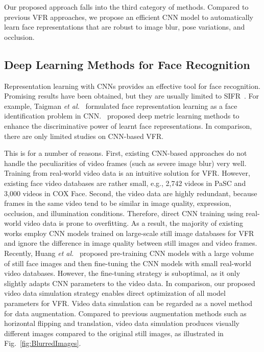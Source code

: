 \documentclass[10pt,journal,cspaper,compsoc]{IEEEtran}
\begin{document}
Our proposed approach falls into the third category of methods.
Compared to previous VFR approaches, we propose an efficient CNN model to automatically learn face representations
that are robust to image blur, pose variations, and occlusion.



\subsection{Deep Learning Methods for Face Recognition}
Representation learning with CNNs provides an effective tool for face recognition.
Promising results have been obtained, but they are usually limited to SIFR~\cite{schroff2015facenet,parkhi2015deep,roychowdhury2015face}.
For example, Taigman \textit{et al.}~\cite{taigman2014deepface} formulated face representation learning as a face identification problem in CNN.~\cite{sun2014deep,hu2014discriminative,schroff2015facenet,lu2015multi} proposed deep metric learning methods to enhance the discriminative power of learnt face representations.
In comparison, there are only limited studies on CNN-based VFR.

This is for a number of reasons. First, existing CNN-based approaches do not handle the peculiarities of video frames (such as severe image blur) very well.
Training from real-world video data is an intuitive solution for VFR.
However, existing face video databases are rather small, e.g., 2,742 videos in PaSC and 3,000 videos in COX Face.
Second, the video data are highly redundant, because frames in the same video tend to be similar in image quality, expression, occlusion, and illumination conditions.
Therefore, direct CNN training using real-world video data is prone to overfitting.
As a result, the majority of existing works employ CNN models trained on large-scale still image databases for VFR~\cite{taigman2014deepface,parkhi2015deep}
and ignore the difference in image quality between still images and video frames.
Recently, Huang \textit{et al.}~\cite{Ross2015report} proposed pre-training CNN models with a large volume of still face images
and then fine-tuning the CNN models with small real-world video databases.
However, the fine-tuning strategy is suboptimal, as it only slightly adapts CNN parameters to the video data.
In comparison, our proposed video data simulation strategy enables direct optimization of all model parameters for VFR.
Video data simulation can be regarded as a novel method for data augmentation.
Compared to previous augmentation methods such as horizontal flipping and translation,
video data simulation produces visually different images compared to the original still images, as illustrated in Fig.~\ref{fig:BlurredImages}.
\end{document}
